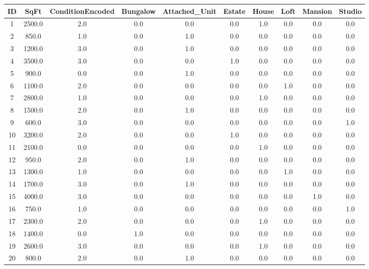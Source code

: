 \documentclass[11pt]{article}
\begin{document}
\begin{center}
\scriptsize
\begin{longtable}{c c c c c c c c c c}
\toprule
ID & SqFt & ConditionEncoded & Bungalow & Attached\_Unit & Estate & House & Loft & Mansion & Studio \\
\midrule
1  & 2500.0 & 2.0 & 0.0 & 0.0 & 0.0 & 1.0 & 0.0 & 0.0 & 0.0 \\
2  & 850.0  & 1.0 & 0.0 & 1.0 & 0.0 & 0.0 & 0.0 & 0.0 & 0.0 \\
3  & 1200.0 & 3.0 & 0.0 & 1.0 & 0.0 & 0.0 & 0.0 & 0.0 & 0.0 \\
4  & 3500.0 & 3.0 & 0.0 & 0.0 & 1.0 & 0.0 & 0.0 & 0.0 & 0.0 \\
5  & 900.0  & 0.0 & 0.0 & 1.0 & 0.0 & 0.0 & 0.0 & 0.0 & 0.0 \\
6  & 1100.0 & 2.0 & 0.0 & 0.0 & 0.0 & 0.0 & 1.0 & 0.0 & 0.0 \\
7  & 2800.0 & 1.0 & 0.0 & 0.0 & 0.0 & 1.0 & 0.0 & 0.0 & 0.0 \\
8  & 1500.0 & 2.0 & 0.0 & 1.0 & 0.0 & 0.0 & 0.0 & 0.0 & 0.0 \\
9  & 600.0  & 3.0 & 0.0 & 0.0 & 0.0 & 0.0 & 0.0 & 0.0 & 1.0 \\
10 & 3200.0 & 2.0 & 0.0 & 0.0 & 1.0 & 0.0 & 0.0 & 0.0 & 0.0 \\
11 & 2100.0 & 0.0 & 0.0 & 0.0 & 0.0 & 1.0 & 0.0 & 0.0 & 0.0 \\
12 & 950.0  & 2.0 & 0.0 & 1.0 & 0.0 & 0.0 & 0.0 & 0.0 & 0.0 \\
13 & 1300.0 & 1.0 & 0.0 & 0.0 & 0.0 & 0.0 & 1.0 & 0.0 & 0.0 \\
14 & 1700.0 & 3.0 & 0.0 & 1.0 & 0.0 & 0.0 & 0.0 & 0.0 & 0.0 \\
15 & 4000.0 & 3.0 & 0.0 & 0.0 & 0.0 & 0.0 & 0.0 & 1.0 & 0.0 \\
16 & 750.0  & 1.0 & 0.0 & 0.0 & 0.0 & 0.0 & 0.0 & 0.0 & 1.0 \\
17 & 2300.0 & 2.0 & 0.0 & 0.0 & 0.0 & 1.0 & 0.0 & 0.0 & 0.0 \\
18 & 1400.0 & 0.0 & 1.0 & 0.0 & 0.0 & 0.0 & 0.0 & 0.0 & 0.0 \\
19 & 2600.0 & 3.0 & 0.0 & 0.0 & 0.0 & 1.0 & 0.0 & 0.0 & 0.0 \\
20 & 800.0  & 2.0 & 0.0 & 1.0 & 0.0 & 0.0 & 0.0 & 0.0 & 0.0 \\
\bottomrule
\end{longtable}
\end{center}
\end{document}
